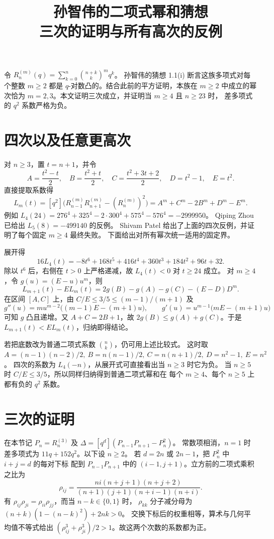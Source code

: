 \documentclass[11pt,UTF8,fontset=fandol]{ctexart}
\title{孙智伟的二项式幂和猜想\\三次的证明与所有高次的反例}
\date{}
\newcommand{\coef}[1]{[q^{#1}]}
\begin{document}
\maketitle

令 \(R_n^{(m)}(q)=\sum_{k=0}^n\binom{n+k}{k}^{m}q^k\)。
孙智伟的猜想 1.1(i) 断言这族多项式对每个整数 \(m\ge2\) 都是
\(q\)-对数凸的\cite{sun}。结合此前的平方证明，本族在 \(m\ge2\) 中成立的幂次恰为
\(m=2,3\)。本文证明三次成立，并证明当 \(m\ge4\) 且 \(n\ge23\) 时，
差多项式的 \(q^2\) 系数严格为负。

\section{四次以及任意更高次}

对 \(n\ge3\)，置 \(t=n+1\)，并令
\[
 A=\frac{t^2-t}{2},\quad B=\frac{t^2+t}{2},\quad
 C=\frac{t^2+3t+2}{2},\quad D=t^2-1,\quad E=t^2.
\]
直接提取系数得
\[
 L_m(t)=\coef{2}\bigl(R_{n-1}^{(m)}R_{n+1}^{(m)}-(R_n^{(m)})^2\bigr)
 =A^m+C^m-2B^m+D^m-E^m.
\]
例如 \(L_4(24)=276^4+325^4-2\cdot300^4+575^4-576^4=-2999950\)。
Qiping Zhou 已给出 \(L_5(8)=-499140\) 的反例\cite{zhou}。
Shivam Patel 给出了上面的四次反例，并证明了每个固定 \(m\ge4\) 最终失败\cite{mathdb}。
下面给出对所有幂次统一适用的固定界。

展开得
\[
 16L_4(t)=-8t^6+168t^5+416t^4+360t^3+184t^2+96t+32.
\]
除以 \(t^6\) 后，右侧在 \(t>0\) 上严格递减，故 \(L_4(t)<0\) 对 \(t\ge24\) 成立。
对 \(m\ge4\)，令 \(g(u)=(E-u)u^m\)，则
\[
 L_{m+1}(t)-E L_m(t)
 =2g(B)-g(A)-g(C)-(E-D)D^m.
\]
在区间 \([A,C]\) 上，由 \(C/E\le3/5\le(m-1)/(m+1)\) 及
\[
 g''(u)=m u^{m-2}\bigl((m-1)E-(m+1)u\bigr),\qquad
 g'(u)=u^{m-1}\bigl(mE-(m+1)u\bigr)
\]
可知 \(g\) 凸且递增。又 \(A+C=2B+1\)，故
\(2g(B)\le g(A)+g(C)\)。于是 \(L_{m+1}(t)<E L_m(t)\)，归纳即得结论。

若把底数改为普通二项式系数 \(\binom nk\)，仍可用上述比较式。
这时取 \(A=(n-1)(n-2)/2,\ B=n(n-1)/2,\ C=n(n+1)/2,\ D=n^2-1,\ E=n^2\)。
四次的系数为 \(L_4(-n)\)，从展开式可直接看出当 \(n\ge3\) 时它为负。
当 \(n\ge5\) 时 \(C/E\le3/5\)，所以同样归纳得到普通二项式幂和在
每个 \(m\ge4\)、每个 \(n\ge5\) 上都有负的 \(q^2\) 系数。

\section{三次的证明}

在本节记 \(P_n=R_n^{(3)}\) 及 \(\Delta=\coef d(P_{n-1}P_{n+1}-P_n^2)\)。
常数项相消，\(n=1\) 时差多项式为 \(11q+152q^2\)。以下设 \(n\ge2\)。
若 \(d=2n\) 或 \(2n-1\)，把 \(P_n^2\) 中 \(i+j=d\) 的每对下标
配到 \(P_{n-1}P_{n+1}\) 中的 \((i-1,j+1)\)。立方前的二项式乘积之比为
\[
 \rho_{ij}=\frac{ni(n+j+1)(n+j+2)}
 {(n+1)(j+1)(n+i-1)(n+i)}.
\]
有 \(\rho_{ij}\rho_{ji}=\rho_{ii}\rho_{jj}\)，而当 \(n-k\in\{0,1\}\) 时，
\(\rho_{kk}\) 分子减分母为 \((n+k)(1-(n-k)^2)+2nk>0\)。
交换下标后的权重相等，算术与几何平均值不等式给出
\((\rho_{ij}^3+\rho_{ji}^3)/2>1\)。故这两个次数的系数都为正。
\end{document}
